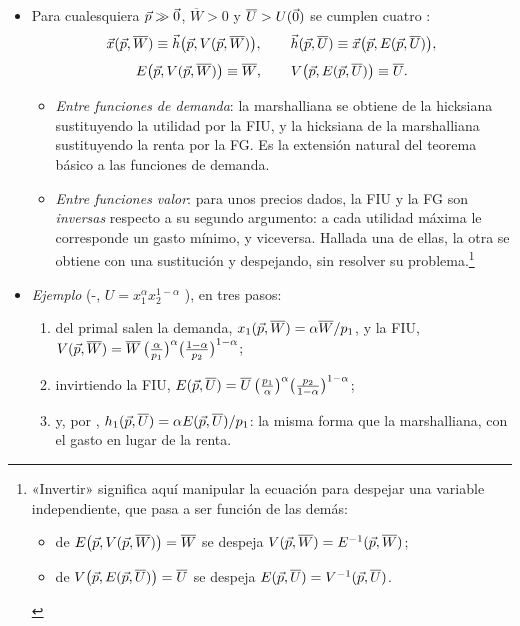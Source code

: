 \documentclass[11pt]{article}
\begin{document}
\begin{itemize}
\item Para cualesquiera $\vec{p}\gg\vec{0}$, $\overline{W}>0$ y $\overline{U}>U(\vec{0})$ se cumplen cuatro :
  \begin{equation}
  \vec{x}(\vec{p},\overline{W})\equiv\vec{h}\big(\vec{p},V(\vec{p},\overline{W})\big),\qquad \vec{h}(\vec{p},\overline{U})\equiv\vec{x}\big(\vec{p},E(\vec{p},\overline{U})\big), \label{eq:dual-demanda}
  \end{equation}
  \begin{equation}
  E\big(\vec{p},V(\vec{p},\overline{W})\big)\equiv\overline{W},\qquad V\big(\vec{p},E(\vec{p},\overline{U})\big)\equiv\overline{U}. \label{eq:dual-valor}
  \end{equation}
  \begin{itemize}
  \item \emph{Entre funciones de demanda}: la marshalliana se obtiene de la hicksiana sustituyendo la utilidad por la FIU, y la hicksiana de la marshalliana sustituyendo la renta por la FG. Es la extensión natural del teorema básico a las funciones de demanda.
  \item \emph{Entre funciones valor}: para unos precios dados, la FIU y la FG son \emph{inversas} respecto a su segundo argumento: a cada utilidad máxima le corresponde un gasto mínimo, y viceversa. Hallada una de ellas, la otra se obtiene con una sustitución y despejando, sin resolver su problema.\footnote{«Invertir» significa aquí manipular la ecuación para despejar una variable independiente, que pasa a ser función de las demás:
\begin{itemize}
\item de $E\big(\vec{p},V(\vec{p},\overline{W})\big)=\overline{W}$ se despeja $V(\vec{p},\overline{W})=E^{-1}(\vec{p},\overline{W})$;
\item de $V\big(\vec{p},E(\vec{p},\overline{U})\big)=\overline{U}$ se despeja $E(\vec{p},\overline{U})=V^{-1}(\vec{p},\overline{U})$.
\end{itemize}}
  \end{itemize}
\item \emph{Ejemplo} (-, $U=x_1^{\alpha}x_2^{1-\alpha}$ ), en tres pasos:
  \begin{enumerate}
  \item del primal salen la demanda, $x_1(\vec{p},\overline{W})=\alpha\overline{W}/p_1$, y la FIU, $V(\vec{p},\overline{W})=\overline{W}\,\big(\tfrac{\alpha}{p_1}\big)^{\alpha}\big(\tfrac{1-\alpha}{p_2}\big)^{1-\alpha}$;
  \item invirtiendo la FIU, $E(\vec{p},\overline{U})=\overline{U}\,\big(\tfrac{p_1}{\alpha}\big)^{\alpha}\big(\tfrac{p_2}{1-\alpha}\big)^{1-\alpha}$;
  \item y, por , $h_1(\vec{p},\overline{U})=\alpha E(\vec{p},\overline{U})/p_1$: la misma forma que la marshalliana, con el gasto en lugar de la renta.
  \end{enumerate}
\end{itemize}
\end{document}
